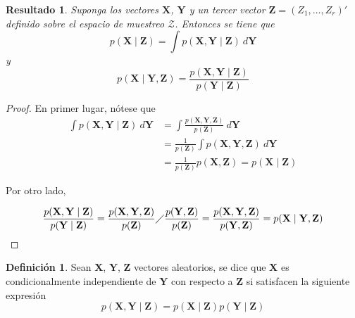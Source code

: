 \documentclass[
  10pt,
  spanish,
]{book}
\newtheorem{proposition}{Resultado}[chapter]
\theoremstyle{definition}
\newtheorem{definition}{Definición}[chapter]
\theoremstyle{definition}
\theoremstyle{definition}
\theoremstyle{definition}
\theoremstyle{remark}
\begin{document}
\begin{proposition}
\protect\hypertarget{prp:Res121}{}{\label{prp:Res121} }Suponga los vectores \(\mathbf{X}\), \(\mathbf{Y}\) y un tercer vector \(\mathbf{Z}=(Z_1,\ldots,Z_r)'\) definido sobre el espacio de muestreo \(\mathcal{Z}\). Entonces se tiene que
\begin{equation}
p(\mathbf{X} \mid \mathbf{Z})=\int p(\mathbf{X},\mathbf{Y} \mid \mathbf{Z})\ d\mathbf{Y}
\end{equation}
y
\begin{equation}
p(\mathbf{X} \mid \mathbf{Y},\mathbf{Z})=\frac{p(\mathbf{X},\mathbf{Y} \mid \mathbf{Z})}{p(\mathbf{Y} \mid \mathbf{Z})}
\end{equation}
\end{proposition}

\begin{proof}
{}En primer lugar, nótese que
\begin{align*}
\int p(\mathbf{X},\mathbf{Y} \mid \mathbf{Z})\ d\mathbf{Y}&=
\int \frac{p(\mathbf{X},\mathbf{Y},\mathbf{Z})}{p(\mathbf{Z})}\ d\mathbf{Y}\\
&=\frac{1}{p(\mathbf{Z})} \int p(\mathbf{X},\mathbf{Y},\mathbf{Z}) \ d\mathbf{Y}\\
&=\frac{1}{p(\mathbf{Z})} p(\mathbf{X},\mathbf{Z})=p(\mathbf{X} \mid \mathbf{Z})
\end{align*}

Por otro lado,

\begin{align*}
\frac{p(\mathbf{X},\mathbf{Y} \mid \mathbf{Z})}{p(\mathbf{Y} \mid \mathbf{Z})}=
\frac{p(\mathbf{X},\mathbf{Y},\mathbf{Z})}{p(\mathbf{Z})} \diagup
\frac{p(\mathbf{Y},\mathbf{Z})}{p(\mathbf{Z})}
=\frac{p(\mathbf{X},\mathbf{Y},\mathbf{Z})}{p(\mathbf{Y},\mathbf{Z})}=p(\mathbf{X} \mid \mathbf{Y},\mathbf{Z})
\end{align*}
\end{proof}

\begin{definition}
\protect\hypertarget{def:unnamed-chunk-6}{}{\label{def:unnamed-chunk-6} }Sean \(\mathbf{X}\), \(\mathbf{Y}\), \(\mathbf{Z}\) vectores aleatorios, se dice que \(\mathbf{X}\) es condicionalmente independiente de \(\mathbf{Y}\) con respecto a \(\mathbf{Z}\) si satisfacen la siguiente expresión
\begin{equation}
p(\mathbf{X},\mathbf{Y} \mid \mathbf{Z})=p(\mathbf{X} \mid \mathbf{Z})p(\mathbf{Y} \mid \mathbf{Z})
\end{equation}
\end{definition}
\end{document}

